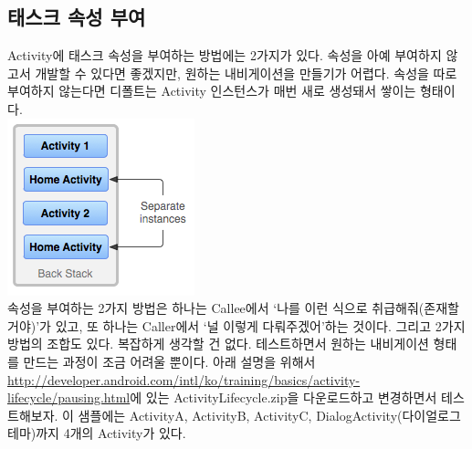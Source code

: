 
\subsection{태스크 속성 부여}
Activity에 태스크 속성을 부여하는 방법에는 2가지가 있다. 속성을 아예 부여하지 않고서 개발할 수 있다면 좋겠지만, 원하는 내비게이션을 만들기가 어렵다. 
속성을 따로 부여하지 않는다면 디폴트는 Activity 인스턴스가 매번 새로 생성돼서 쌓이는 형태이다.\\
\includegraphics[scale=0.7]{diagram_multiple_instances}\\
속성을 부여하는 2가지 방법은 하나는 Callee에서 `나를 이런 식으로 취급해줘(존재할거야)'가 있고, 또 하나는 Caller에서 `널 이렇게 다뤄주겠어'하는 것이다. 그리고 2가지 방법의 조합도 있다.
복잡하게 생각할 건 없다. 테스트하면서 원하는 내비게이션 형태를 만드는 과정이 조금 어려울 뿐이다.
아래 설명을 위해서 \url{http://developer.android.com/intl/ko/training/basics/activity-lifecycle/pausing.html}에 있는 ActivityLifecycle.zip을 다운로드하고 변경하면서 테스트해보자. 
이 샘플에는 ActivityA, ActivityB, ActivityC, DialogActivity(다이얼로그 테마)까지 4개의 Activity가 있다.


